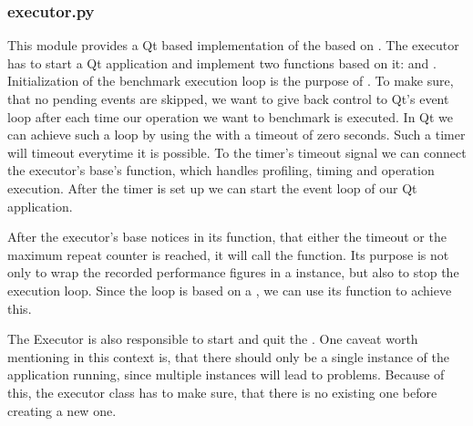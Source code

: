 

\subsubsection*{executor.py}

This module provides a Qt based implementation of the
 based on
. The executor has to start a Qt application
and implement two functions based on it:  and
. Initialization of the benchmark execution loop is the
purpose of . To make sure, that no pending events
are skipped, we want to give back control to Qt's event loop after each time our
operation we want to benchmark is executed. In Qt we can achieve such a loop
by using the  with a timeout of zero seconds.
Such a timer will timeout everytime it is possible. 
To the timer's timeout signal we can connect the executor's base's
 function, which handles profiling, timing
and operation execution. After the timer is set up we can start the event loop
of our Qt application.



After the executor's base notices in its
 function, that either the timeout or
the maximum repeat counter is reached, it will call the
 function. Its purpose is not only to wrap the
recorded performance figures in a  instance,
but also to stop the execution loop. Since the loop is based on a
, we can use its 
function to achieve this.



The Executor is also responsible to start and quit the
. One caveat worth mentioning in this
context is, that there should only be a single instance of the application
running, since multiple  instances will lead to
problems. Because of this, the executor class has to make sure, that there is
no existing one before creating a new one.

